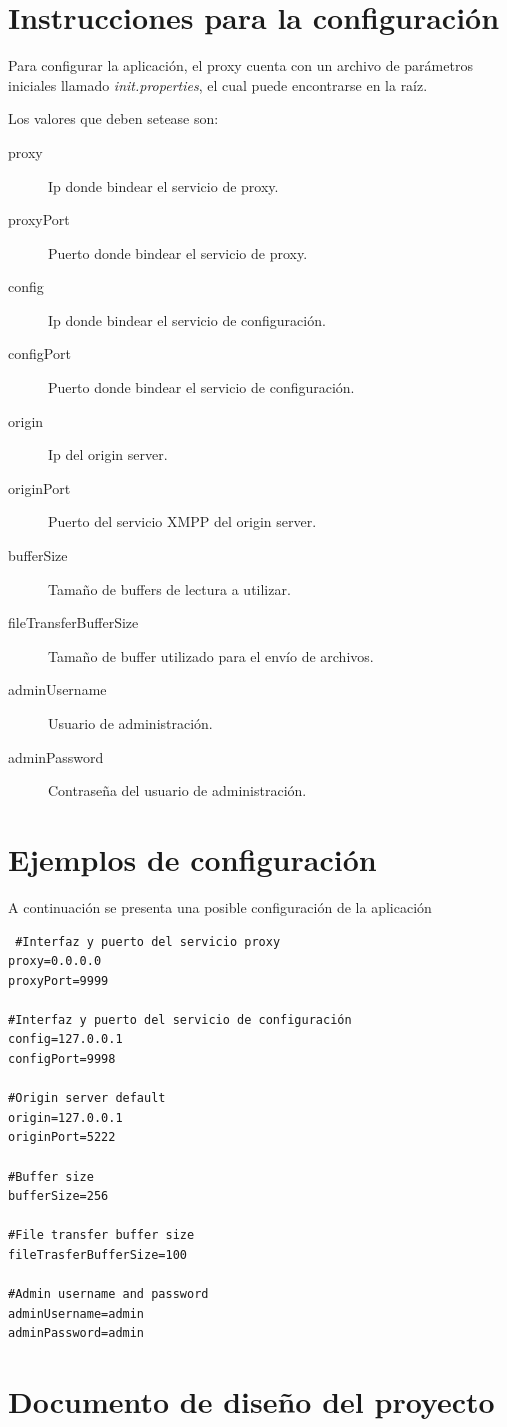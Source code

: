 \documentclass[a4paper,10pt]{article}
\begin{document}
\section{Instrucciones para la configuración}
Para configurar la aplicación, el proxy cuenta con un archivo de parámetros iniciales llamado \textit{init.properties}, el cual puede
encontrarse en la raíz.

Los valores que deben setease son:
\begin{description}
 \item [proxy] Ip donde bindear el servicio de proxy.
 \item [proxyPort] Puerto donde bindear el servicio de proxy.
 \item [config] Ip donde bindear el servicio de configuración.
 \item [configPort] Puerto donde bindear el servicio de configuración.
 \item [origin] Ip del origin server.
 \item [originPort] Puerto del servicio XMPP del origin server.
 \item [bufferSize] Tamaño de buffers de lectura a utilizar.
 \item [fileTransferBufferSize] Tamaño de buffer utilizado para el envío de archivos.
 \item [adminUsername] Usuario de administración.
 \item [adminPassword] Contraseña del usuario de administración.

\end{description}

\section{Ejemplos de configuración}
A continuación se presenta una posible configuración de la aplicación

\begin{verbatim}
 #Interfaz y puerto del servicio proxy
proxy=0.0.0.0
proxyPort=9999

#Interfaz y puerto del servicio de configuración
config=127.0.0.1
configPort=9998

#Origin server default
origin=127.0.0.1
originPort=5222

#Buffer size
bufferSize=256

#File transfer buffer size
fileTrasferBufferSize=100

#Admin username and password
adminUsername=admin
adminPassword=admin
\end{verbatim}


\section{Documento de diseño del proyecto}
\end{document}
